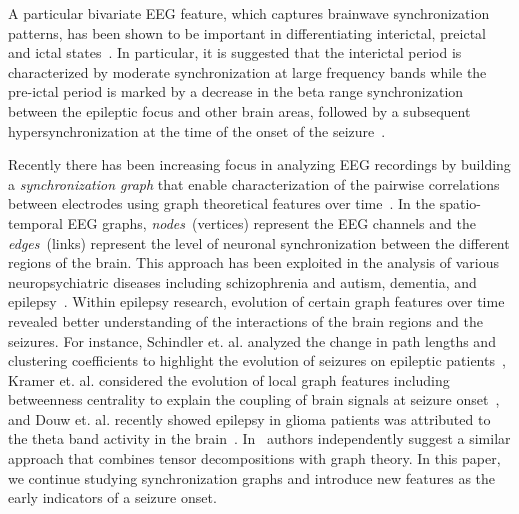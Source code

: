\documentclass{article} %
\begin{document}
A particular bivariate EEG feature, which captures  brainwave synchronization patterns, has been shown to be important in differentiating interictal, preictal and ictal states~\cite{vanquyen_ictogenesis,levan_preictal}.  In particular, it is  suggested that the interictal period is characterized by moderate synchronization at large frequency bands while the pre-ictal period is marked by a decrease in the beta range synchronization between the epileptic focus and other brain areas, followed by a subsequent hypersynchronization at the time of the onset of the seizure~\cite{mirowski_seizure_prediction_classification}.

Recently there has been increasing focus in analyzing EEG recordings by building a {\em synchronization graph} that enable characterization of the pairwise correlations between electrodes using graph theoretical features over time~\cite{bullmore2009complex,stam2012organization}.  In the spatio-temporal EEG  graphs, {\em nodes}~(vertices) represent the EEG channels and the {\em edges}~(links) represent the level of  neuronal synchronization between the different regions of the brain.  This approach has been exploited in the analysis of various neuropsychiatric diseases including schizophrenia and autism, dementia, and epilepsy~\cite{stam2012organization}.  Within epilepsy research,  evolution  of certain  graph  features over time revealed better understanding of the interactions  of the brain regions and the seizures.  For instance, Schindler et. al. analyzed the change in path lengths and clustering coefficients to highlight the evolution of seizures on epileptic patients~\cite{schindler2008evolving}, Kramer et. al.  considered  the  evolution  of  local graph features including betweenness centrality to explain the coupling of brain signals at seizure onset~\cite{kramer2008emergent}, and Douw et. al. recently showed epilepsy in glioma patients was attributed to the theta band activity in the brain~\cite{douw2010epilepsy}.  In~\cite{mahyari_tensor_brain} authors independently suggest a similar approach that combines tensor decompositions with graph theory.  In  this paper, we continue studying synchronization graphs  and introduce new features as the early indicators of a seizure onset.
\end{document}
